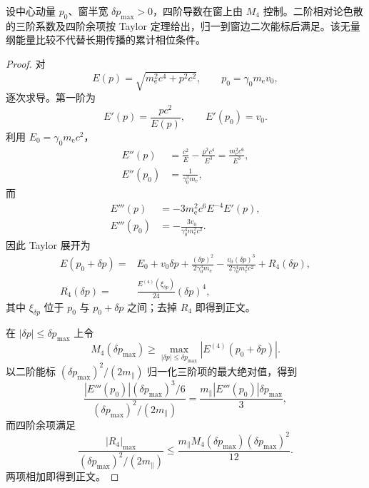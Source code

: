 \begin{proposition}
设中心动量 $p_0$、窗半宽 $\delta p_{\max}>0$，四阶导数在窗上由 $M_4$ 控制。二阶相对论色散的三阶系数及四阶余项按 Taylor 定理给出，归一到窗边二次能标后满足。该无量纲能量比较不代替长期传播的累计相位条件。
\end{proposition}
\begin{proof}
对
\begin{equation*}
E(p)=\sqrt{m_{\mathrm e}^2c^4+p^2c^2},
\qquad p_0=\gamma_0m_{\mathrm e} v_0,
\end{equation*}
逐次求导。第一阶为
\begin{equation*}
E'(p)=\frac{pc^2}{E(p)},
\qquad E'(p_0)=v_0.
\end{equation*}
利用 $E_0=\gamma_0m_{\mathrm e} c^2$，
\begin{align*}
E''(p)
&=\frac{c^2}{E}-\frac{p^2c^4}{E^3}
=\frac{m_{\mathrm e}^2c^6}{E^3},\\
E''(p_0)&=\frac{1}{\gamma_0^3m_{\mathrm e}},
\end{align*}
而
\begin{align*}
E'''(p)
&=-3m_{\mathrm e}^2c^6E^{-4}E'(p),\\
E'''(p_0)
&=-\frac{3v_0}{\gamma_0^4m_{\mathrm e}^2c^2}.
\end{align*}
因此 Taylor 展开为
\begin{align*}
E(p_0+\delta p)
={}&E_0+v_0\delta p
+\frac{(\delta p)^2}{2\gamma_0^3m_{\mathrm e}}
-\frac{v_0(\delta p)^3}{2\gamma_0^4m_{\mathrm e}^2c^2}
+R_4(\delta p),\\
R_4(\delta p)
={}&\frac{E^{(4)}(\xi_{\delta p})}{24}(\delta p)^4,
\end{align*}
其中 $\xi_{\delta p}$ 位于 $p_0$ 与 $p_0+\delta p$ 之间；去掉 $R_4$ 即得到正文。

在 $|\delta p|\le\delta p_{\max}$ 上令
\begin{equation*}
M_4(\delta p_{\max})
\ge \max_{|\delta p|\le\delta p_{\max}}
|E^{(4)}(p_0+\delta p)|.
\end{equation*}
以二阶能标 $(\delta p_{\max})^2/(2m_\parallel)$ 归一化三阶项的最大绝对值，得到
\begin{equation*}
\frac{|E'''(p_0)|(\delta p_{\max})^3/6}
{(\delta p_{\max})^2/(2m_\parallel)}
=\frac{m_\parallel|E'''(p_0)|\delta p_{\max}}{3},
\end{equation*}
而四阶余项满足
\begin{equation*}
\frac{|R_4|_{\max}}
{(\delta p_{\max})^2/(2m_\parallel)}
\le
\frac{m_\parallel M_4(\delta p_{\max})(\delta p_{\max})^2}{12}.
\end{equation*}
两项相加即得到正文。
\end{proof}


